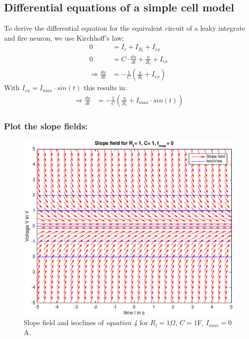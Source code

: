 \documentclass[
a4paper, 
12pt, 
]{article}
\begin{document}
\subsection{Differential equations of a simple cell model}
To derive the differential equation for the equivalent circuit of a leaky integrate and fire neuron, we use Kirchhoff's law: 
\begin{align}
0 &= I_c + I_{R_l} + I_{ex} \\
0 &= C\cdot\frac{du}{dt} + \frac{u}{R_l} + I_{ex} \nonumber \\
\Rightarrow \frac{du}{dt} &= -\frac{1}{C}\left(\frac{u}{R_l} + I_{ex} \right) \nonumber
\end{align}
With $I_{ex} = I_{max}\cdot sin(t)$ this results in:
\begin{align}
\Rightarrow \frac{du}{dt} &= -\frac{1}{C}\left(\frac{u}{R_l} + I_{max}\cdot sin(t) \right) 
\end{align}

\subsubsection*{Plot the slope fields:}
\begin{figure}[h]
\centering
\includegraphics[width=0.85\linewidth]{Plots/lif_1}
\caption{Slope field and isoclines of \textit{equation 4} for $R_l = 1 \Omega$, $C=1$F, $I_{max}=0$A.}
\label{fig:lif_1}
\end{figure}
\end{document}
